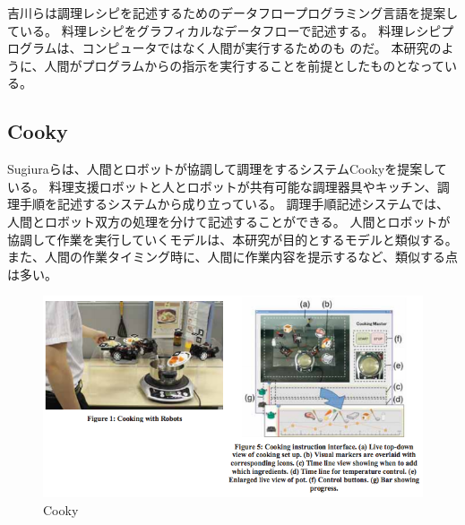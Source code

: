 吉川らは調理レシピを記述するためのデータフロープログラミング言語を提案している\cite{recipe-programming}。
料理レシピをグラフィカルなデータフローで記述する。
料理レシピプログラムは、コンピュータではなく人間が実行するためのも
のだ。
本研究のように、人間がプログラムからの指示を実行することを前提としたものとなっている。

\subsection{Cooky}\label{cooky}

Sugiuraらは、人間とロボットが協調して調理をするシステムCooky\cite{cooky}を提案している。
料理支援ロボットと人とロボットが共有可能な調理器具やキッチン、調理手順を記述するシステムから成り立っている。
調理手順記述システムでは、人間とロボット双方の処理を分けて記述することができる。
人間とロボットが協調して作業を実行していくモデルは、本研究が目的とするモデルと類似する。
また、人間の作業タイミング時に、人間に作業内容を提示するなど、類似する点は多い。

\begin{figure}[htbp]
  \begin{center}
  \includegraphics[width=.6\linewidth,bb=0 0 633 336]{images/cooky.png}
  \end{center}
  \caption{Cooky}
  \label{fig:cooky}
\end{figure}
